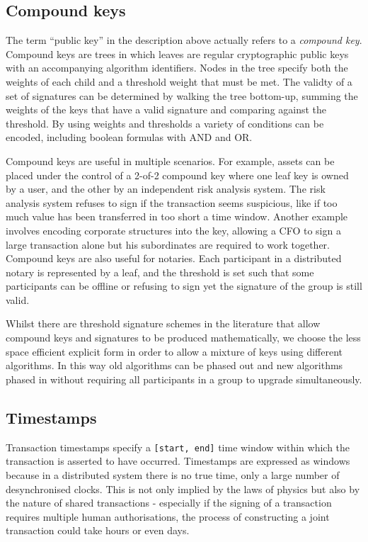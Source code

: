 \documentclass{article}
\begin{document}
\subsection{Compound keys}\label{sec:compound-keys}

The term ``public key'' in the description above actually refers to a \emph{compound key}. Compound keys are trees in
which leaves are regular cryptographic public keys with an accompanying algorithm identifiers. Nodes in the tree specify
both the weights of each child and a threshold weight that must be met. The validty of a set of signatures can be
determined by walking the tree bottom-up, summing the weights of the keys that have a valid signature and comparing
against the threshold. By using weights and thresholds a variety of conditions can be encoded, including boolean
formulas with AND and OR.

Compound keys are useful in multiple scenarios. For example, assets can be placed under the control of a 2-of-2
compound key where one leaf key is owned by a user, and the other by an independent risk analysis system. The
risk analysis system refuses to sign if the transaction seems suspicious, like if too much value has been
transferred in too short a time window. Another example involves encoding corporate structures into the key,
allowing a CFO to sign a large transaction alone but his subordinates are required to work together. Compound keys
are also useful for notaries. Each participant in a distributed notary is represented by a leaf, and the threshold
is set such that some participants can be offline or refusing to sign yet the signature of the group is still valid.

Whilst there are threshold signature schemes in the literature that allow compound keys and signatures to be produced
mathematically, we choose the less space efficient explicit form in order to allow a mixture of keys using different
algorithms. In this way old algorithms can be phased out and new algorithms phased in without requiring all
participants in a group to upgrade simultaneously.

\subsection{Timestamps}

Transaction timestamps specify a \texttt{[start, end]} time window within which the transaction is asserted to have
occurred. Timestamps are expressed as windows because in a distributed system there is no true time, only a large number
of desynchronised clocks. This is not only implied by the laws of physics but also by the nature of shared transactions
- especially if the signing of a transaction requires multiple human authorisations, the process of constructing
a joint transaction could take hours or even days.
\end{document}
